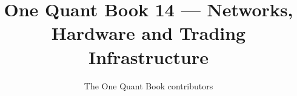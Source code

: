 \documentclass[11pt,a4paper,twoside,openany]{book}
\title{One Quant Book 14 --- Networks, Hardware and Trading Infrastructure}
\author{The One Quant Book contributors}
\date{\bookdate}
\begin{document}
\frontmatter



\tableofcontents

\mainmatter


\appendix
\part{\omsolutionspart}


\backmatter
\printindex
\end{document}
